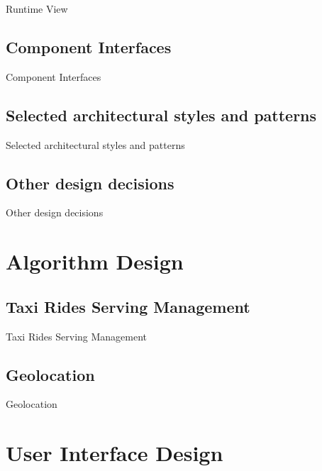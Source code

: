 \documentclass{../common/latex_classes/pdf_presentation}
\begin{document}
	\begin{frame}{Runtime View}
	\end{frame}
	
	\subsection{Component Interfaces}
		
	\begin{frame}{Component Interfaces}
	\end{frame}
	
	\subsection{Selected architectural styles and patterns}
	
	\begin{frame}{Selected architectural styles and patterns}
	\end{frame}
	
	\subsection{Other design decisions}
		
	\begin{frame}{Other design decisions}
	\end{frame}
	
	\section{Algorithm Design}
	
	\subsection{Taxi Rides Serving Management}
	
	\begin{frame}{Taxi Rides Serving Management}
	\end{frame}
	
	\subsection{Geolocation}
	
	\begin{frame}{Geolocation}
	\end{frame}
	
	\section{User Interface Design}
	
\end{document}
